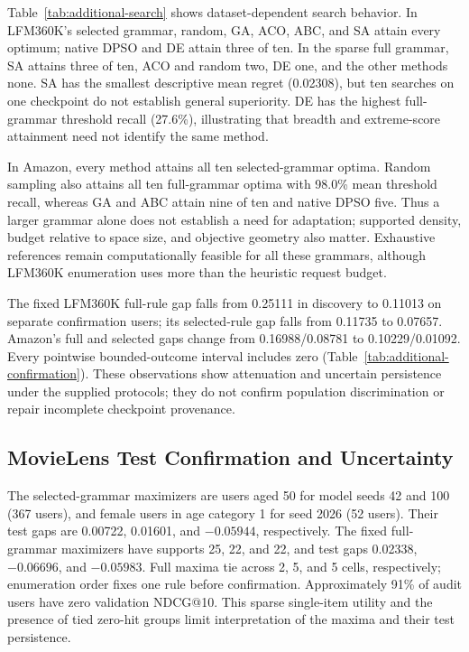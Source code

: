Table~\ref{tab:additional-search} shows dataset-dependent search behavior. In LFM360K's selected grammar, random, GA, ACO, ABC, and SA attain every optimum; native DPSO and DE attain three of ten. In the sparse full grammar, SA attains three of ten, ACO and random two, DE one, and the other methods none. SA has the smallest descriptive mean regret (0.02308), but ten searches on one checkpoint do not establish general superiority. DE has the highest full-grammar threshold recall (27.6\%), illustrating that breadth and extreme-score attainment need not identify the same method.

In Amazon, every method attains all ten selected-grammar optima. Random sampling also attains all ten full-grammar optima with 98.0\% mean threshold recall, whereas GA and ABC attain nine of ten and native DPSO five. Thus a larger grammar alone does not establish a need for adaptation; supported density, budget relative to space size, and objective geometry also matter. Exhaustive references remain computationally feasible for all these grammars, although LFM360K enumeration uses more than the heuristic request budget.


The fixed LFM360K full-rule gap falls from 0.25111 in discovery to 0.11013 on separate confirmation users; its selected-rule gap falls from 0.11735 to 0.07657. Amazon's full and selected gaps change from 0.16988/0.08781 to 0.10229/0.01092. Every pointwise bounded-outcome interval includes zero (Table~\ref{tab:additional-confirmation}). These observations show attenuation and uncertain persistence under the supplied protocols; they do not confirm population discrimination or repair incomplete checkpoint provenance.

\subsection{MovieLens Test Confirmation and Uncertainty}

The selected-grammar maximizers are users aged 50 for model seeds 42 and 100 (367 users), and female users in age category 1 for seed 2026 (52 users). Their test gaps are 0.00722, 0.01601, and $-0.05944$, respectively. The fixed full-grammar maximizers have supports 25, 22, and 22, and test gaps 0.02338, $-0.06696$, and $-0.05983$. Full maxima tie across 2, 5, and 5 cells, respectively; enumeration order fixes one rule before confirmation. Approximately 91\% of audit users have zero validation NDCG@10. This sparse single-item utility and the presence of tied zero-hit groups limit interpretation of the maxima and their test persistence.

